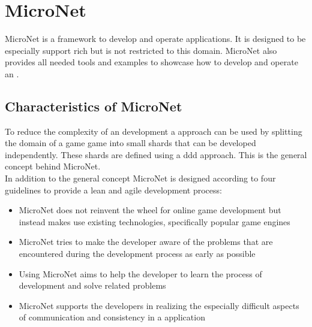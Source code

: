 \section{MicroNet}

MicroNet is a framework to develop and operate \ms{} applications. It is
designed to be especially support rich \ogs{} but is not restricted to this
domain. MicroNet also provides all needed tools and examples to showcase how to
develop and operate an \og{}.

\subsection{Characteristics of MicroNet}

To reduce the complexity of an \og{} development a \ms{} approach can be used by
splitting the domain of a game game into small shards that can be developed
independently. These shards are defined using a  \gls{ddd}
approach. This is the general concept behind MicroNet.\\

In addition to the general concept MicroNet is designed according to four
guidelines to provide a lean and agile \og{} development process:
\begin{itemize}
  \item MicroNet does not reinvent the wheel for online game development but
  instead makes use existing technologies, specifically popular game engines
  \item MicroNet tries to make the developer aware of the problems that are
  encountered during the development process as early as possible
  
  \item Using MicroNet aims to help the developer to learn the process of \og{}
  development and solve related problems
  \item MicroNet supports the developers in realizing the especially
  difficult aspects of communication and consistency in a \ms{} application
\end{itemize}







 

